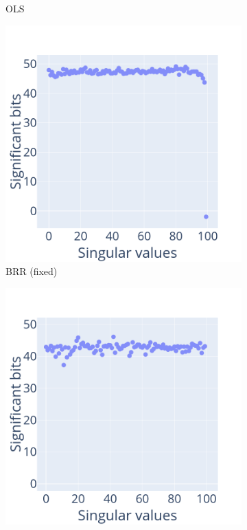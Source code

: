 \documentclass[10pt,journal,compsoc]{IEEEtran}
\begin{document}
\begin{figure}
\begin{subfigure}{0.49\linewidth}
        \caption{OLS}
        \label{fig:OLS_svd}
    \end{subfigure}
    \begin{subfigure}{0.49\linewidth}
        \includegraphics[width=\linewidth]{figure/BRR_singular_values_fixed.png}
        \caption{BRR (fixed)}
        \label{fig:BRR_svd_fixed}
    \end{subfigure}
    \begin{subfigure}{0.49\linewidth}
        \includegraphics[width=\linewidth]{figure/OLS_singular_values_fixed.png}

\end{subfigure}
\end{figure}
\end{document}
